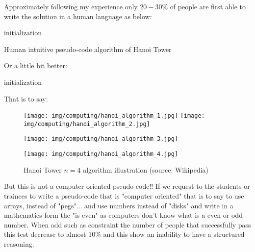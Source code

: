 	Approximately following my experience only $20-30\%$ of people are first able to write the solution in a human language as below:
	
	\begin{algorithm}[H]
	 initialization\;
	 \caption{Human intuitive pseudo-code algorithm of Hanoi Tower}
	\end{algorithm}
	
	Or a little bit better:
	
	\begin{algorithm}[H]
	initialization\;
	\end{algorithm}
	That is to say:
	\begin{figure}[H]
		\centering
		\texttt{[image: img/computing/hanoi\_algorithm\_1.jpg]}
		\texttt{[image: img/computing/hanoi\_algorithm\_2.jpg]}
	\end{figure}
	\begin{figure}[H]
		\centering
		\texttt{[image: img/computing/hanoi\_algorithm\_3.jpg]}
	\end{figure}
	\begin{figure}[H]
		\centering
		\texttt{[image: img/computing/hanoi\_algorithm\_4.jpg]}
		\caption[Hanoi Tower algorithm illustration]{Hanoi Tower $n=4$ algorithm illustration (source: Wikipedia)}
	\end{figure}
	
	But this is not a computer oriented pseudo-code!! If we request to the students or trainees to write a pseudo-code that is "computer oriented" that is to say to use arrays, instead of "pegs"... and use numbers instead of "disks" and write in a mathematics form the "is even" as computers don't know what is a even or odd number. When add such as constraint the number of people that successfully pass this test decrease to almost $10\%$ and this show an inability to have a structured reasoning.
	
